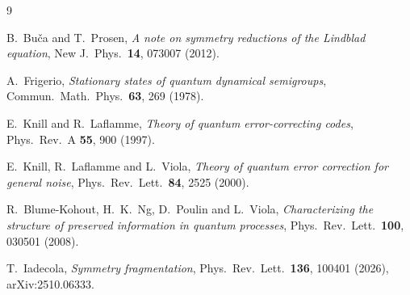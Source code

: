 \documentclass[11pt]{article}
\theoremstyle{plain}
\theoremstyle{remark}
\begin{document}
\begin{thebibliography}{9}

 B.~Bu\v{c}a and T.~Prosen,
  \emph{A note on symmetry reductions of the Lindblad equation},
  New J.\ Phys.\ \textbf{14}, 073007 (2012).

 A.~Frigerio,
  \emph{Stationary states of quantum dynamical semigroups},
  Commun.\ Math.\ Phys.\ \textbf{63}, 269 (1978).

 E.~Knill and R.~Laflamme,
  \emph{Theory of quantum error-correcting codes},
  Phys.\ Rev.\ A \textbf{55}, 900 (1997).

 E.~Knill, R.~Laflamme and L.~Viola,
  \emph{Theory of quantum error correction for general noise},
  Phys.\ Rev.\ Lett.\ \textbf{84}, 2525 (2000).

 R.~Blume-Kohout, H.~K.~Ng, D.~Poulin and L.~Viola,
  \emph{Characterizing the structure of preserved information in quantum
  processes},
  Phys.\ Rev.\ Lett.\ \textbf{100}, 030501 (2008).

 T.~Iadecola,
  \emph{Symmetry fragmentation},
  Phys.\ Rev.\ Lett.\ \textbf{136}, 100401 (2026), arXiv:2510.06333.

\end{thebibliography}
\end{document}
